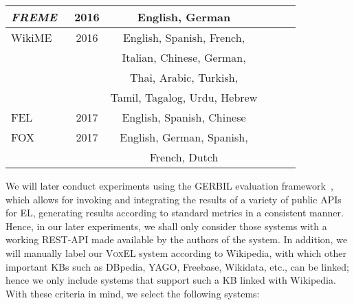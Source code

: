\documentclass{llncs}
\newcommand{\cmark}{\ding{51}}%
\newcommand{\xmark}{\ding{55}}%
\begin{document}
\begin{table}[t]
\begin{tabular}{lccccr}
		\textit{FREME}~\cite{freme-ner2016}&2016&English, German&\xmark&\cmark&\cmark\\\midrule
		
		WikiME \cite{Cross-Lingual-Wikifier-tsai2016cross} & 2016 & English, Spanish, French,&\cmark&\xmark&\xmark\\
		& &Italian, Chinese, German,&&&\\
		& &Thai, Arabic, Turkish,&&&\\
		& &Tamil, Tagalog, Urdu, Hebrew&&&\\\midrule		
		
		FEL~\cite{FEL-pappu2017lightweight}& 2017 &English, Spanish, Chinese&\xmark&\cmark&\xmark\\\midrule
		
		FOX~\cite{fox2017}&2017&English, German, Spanish,&\cmark&\cmark&\cmark\\
		& & French, Dutch &&&\\
		
		\bottomrule
	\end{tabular}
\end{table}

We will later conduct experiments using the GERBIL evaluation framework~\cite{gerbil-2015}, which allows for invoking and integrating the results of a variety of public APIs for EL, generating results according to standard metrics in a consistent manner. Hence, in our later experiments, we shall only consider those systems with a working REST-API made available by the authors of the system. In addition, we will manually label our \textsc{VoxEL} system according to Wikipedia, with which other important KBs such as DBpedia, YAGO, Freebase, Wikidata, etc., can be linked; hence we only include systems that support such a KB linked with Wikipedia. With these criteria in mind, we select the following systems: 
\end{document}
